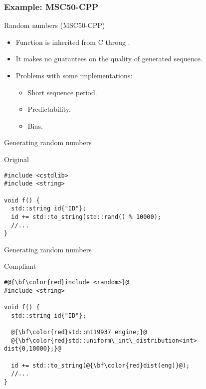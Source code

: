 \subsubsection{Example: MSC50-CPP}

\begin{frame}[t]{Random numbers (MSC50-CPP)}
\begin{itemize}
  \item Function  is inherited from C throug .

  \vfill
  \item It makes no guarantees on the quality of generated sequence.

  \vfill
  \item Problems with some implementations:
    \begin{itemize}
      \item Short sequence period.
      \item Predictability.
      \item Bias.
    \end{itemize}
\end{itemize}
\end{frame}

\begin{frame}[t,fragile]{Generating random numbers}
\begin{block}{Original}
\begin{lstlisting}
#include <cstdlib>
#include <string>

void f() {
  std::string id{"ID"};
  id += std::to_string(std::rand() % 10000);
  //...
}
\end{lstlisting}
\end{block}
\end{frame}

\begin{frame}[t,fragile]{Generating random numbers}
\begin{block}{Compliant}
\begin{lstlisting}[escapechar=@]
#@{\bf\color{red}include <random>}@
#include <string>

void f() {
  std::string id{"ID"};

  @{\bf\color{red}std::mt19937 engine;}@
  @{\bf\color{red}std::uniform\_int\_distribution<int> dist{0,10000};}@

  id += std::to_string(@{\bf\color{red}dist(eng)}@);
  //...
}

\end{lstlisting}
\end{block}
\end{frame}

